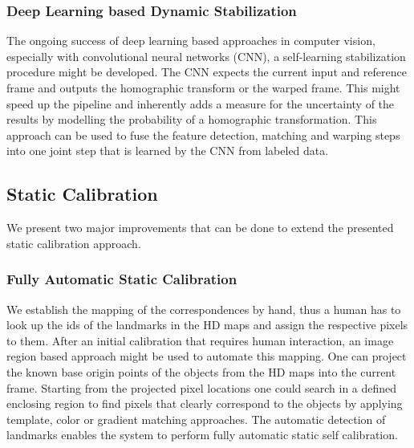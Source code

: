 \subsubsection{Deep Learning based Dynamic Stabilization}
The ongoing success of deep learning based approaches in computer vision, especially with convolutional neural networks (CNN), a self-learning stabilization procedure might be developed.
The CNN expects the current input and reference frame and outputs the homographic transform or the warped frame. 
This might speed up the pipeline and inherently adds a measure for the uncertainty of the results by modelling the probability of a homographic transformation.
This approach can be used to fuse the feature detection, matching and warping steps into one joint step that is learned by the CNN from labeled data.


\subsection{Static Calibration}
We present two major improvements that can be done to extend the presented static calibration approach.

\subsubsection{Fully Automatic Static Calibration}
\label{sec:auto_mapping_landmarks}
We establish the mapping of the correspondences by hand, thus a human has to look up the ids of the landmarks in the HD maps and assign the respective pixels to them.
After an initial calibration that requires human interaction, an image region based approach might be used to automate this mapping.
One can project the known base origin points of the objects from the HD maps into the current frame.
Starting from the projected pixel locations one could search in a defined enclosing region to find pixels that clearly correspond to the objects by applying template, color or gradient matching approaches.
The automatic detection of landmarks enables the system to perform fully automatic static self calibration.

